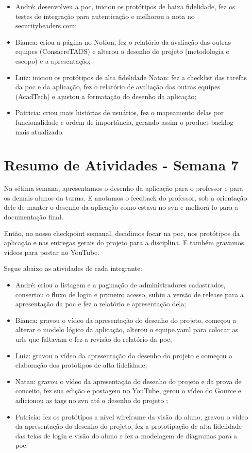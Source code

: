 \begin{apendicesenv}
\begin{itemize}
\item André: desenvolveu a \ac{poc}, iniciou os protótipos de baixa fidelidade, fez os testes de integração para autenticação e melhorou a nota no securityheaders.com;
\item Bianca: criou a página no Notion, fez o relatório da avaliação das outras equipes (ConsacreTADS) e alterou o desenho do projeto (metodologia e escopo) e a apresentação;
\item Luiz: iniciou os protótipos de alta fidelidade
Natan: fez a \gls{checklist} das tarefas da \ac{poc} e da aplicação, fez o relatório de avaliação das outras equipes (AcadTech) e ajustou a formatação do desenho da aplicação;
\item Patricia: criou mais histórias de usuários, fez o mapeamento delas por funcionalidade e ordem de importância, gerando assim o \gls{product-backlog} mais atualizado.
\end{itemize}

\section{Resumo de Atividades - Semana 7}
Na sétima semana, apresentamos o desenho da aplicação para o professor e para os demais alunos da turma. E anotamos o feedback do professor, sob a orientação dele de manter o desenho da aplicação como estava no \ac{svn} e melhorá-lo para a documentação final.

Então, no nosso checkpoint semanal, decidimos focar na \ac{poc}, nos protótipos da aplicação e nas entregas gerais do projeto para a disciplina. E também gravamos vídeos para postar no YouTube.

Segue abaixo as atividades de cada integrante:

\begin{itemize}
\item André: criou a listagem e a paginação de administradores cadastrados, consertou o fluxo de login e primeiro acesso, subiu a versão de \gls{release} para a apresentação da \ac{poc} e fez o relatório e apresentação dela;
\item Bianca: gravou o vídeo da apresentação do desenho do projeto, começou a alterar o modelo lógico da aplicação, alterou o equipe.yaml para colocar as \ac{url}s que faltavam e fez a revisão do relatório da \ac{poc};
\item Luiz: gravou o vídeo da apresentação do desenho do projeto e começou a elaboração dos protótipos de alta fidelidade;
\item Natan: gravou o vídeo da apresentação do desenho do projeto e da prova de conceito, fez sua edição e postagem no YouTube, gerou o vídeo do Gource e adicionou as tags no \ac{svn} até o desenho do projeto ;
\item Patricia: fez os protótipos a nível \gls{wireframe} da visão do aluno, gravou o vídeo da apresentação do desenho do projeto, fez a prototipação de alta fidelidade das telas de login e visão do aluno e fez a modelagem de diagramas para a \ac{poc}.
\end{itemize}


\end{apendicesenv}
